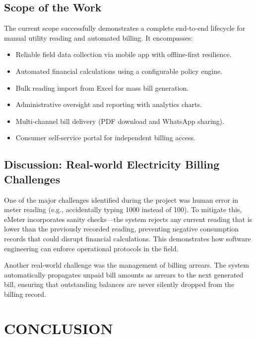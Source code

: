 \documentclass[12pt, a4paper, onecolumn]{report}
\begin{document}
\section{Scope of the Work}
The current scope successfully demonstrates a complete end-to-end lifecycle for manual utility reading and automated billing. It encompasses:
\begin{itemize}
    \item Reliable field data collection via mobile app with offline-first resilience.
    \item Automated financial calculations using a configurable policy engine.
    \item Bulk reading import from Excel for mass bill generation.
    \item Administrative oversight and reporting with analytics charts.
    \item Multi-channel bill delivery (PDF download and WhatsApp sharing).
    \item Consumer self-service portal for independent billing access.
\end{itemize}

\section{Discussion: Real-world Electricity Billing Challenges}
One of the major challenges identified during the project was human error in meter reading (e.g., accidentally typing 1000 instead of 100). To mitigate this, eMeter incorporates sanity checks---the system rejects any current reading that is lower than the previously recorded reading, preventing negative consumption records that could disrupt financial calculations. This demonstrates how software engineering can enforce operational protocols in the field.

Another real-world challenge was the management of billing arrears. The system automatically propagates unpaid bill amounts as arrears to the next generated bill, ensuring that outstanding balances are never silently dropped from the billing record.

\chapter{CONCLUSION}
\end{document}

